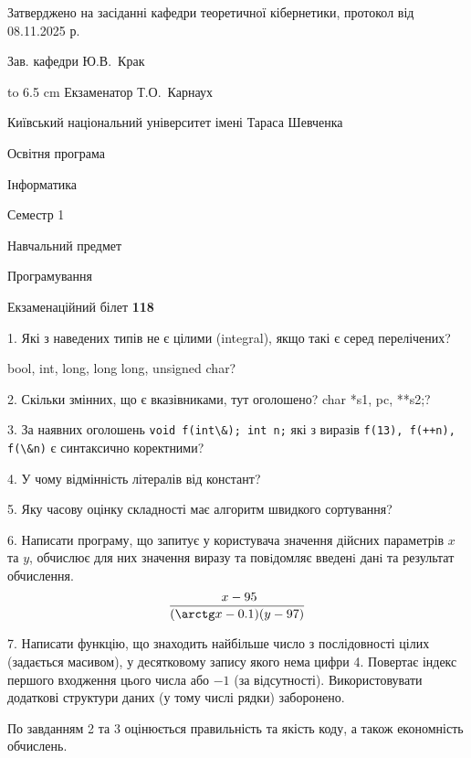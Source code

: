\documentclass[12pt, ukrainian]{article}
\def\code#1{\Verb!#1!}
\begin{document}
{\smallskip\smallskip \begin {scriptsize} Затверджено на засіданні кафедри теоретичної кібернетики, протокол   від   08.11.2025 р.\par\smallskip\smallskip\smallskip\smallskip
{\parbox {6.5 cm} {Зав. кафедри \dotfill Ю.В.~Крак}}\hspace {0.7cm} {\hbox to 6.5 cm { Екзаменатор \dotfill Т.О.~Карнаух}} \end{scriptsize}}
\vspace{0.9cm}
{{\begin {scriptsize}\par
{ \center  Київський національний університет імені Тараса Шевченка \par}
{\parbox {5 cm}{Освітня програма \hfill}{\parbox {7 cm}{Інформатика\hfill}}\parbox {6 cm}{\hfill Семестр 1}}\par
{\parbox {5 cm} {Навчальний предмет \hfill}\parbox {7 cm}{Програмування \hfill}\parbox {6cm}{\hfill}\par}\vspace{-15pt} \end{scriptsize}}{\center Екзаменаційний білет \No \textbf { 118 }\par}}
{%
1. Які з наведених типів не є цілими (integral), якщо такі є серед перелічених?

bool, int, long, long long, unsigned char?
\par
\vspace{2mm}
2. Скільки змінних, що є вказівниками, тут оголошено?
char *s1, pc, **s2;?
\par
\vspace{2mm}
3. За наявних оголошень \code{void f(int\&); int n;} які з виразів \code{f(13), f(++n), f(\&n)} є синтаксично коректними?
\par
\vspace{2mm}
4. У чому відмінність літералів від констант?
\par
\vspace{2mm}
5. Яку часову оцінку складності має алгоритм швидкого сортування?
\par
\vspace{2mm}
6. Написати програму, що запитує у користувача значення дійсних параметрів $x$ та $y$, обчислює для них значення виразу та повiдомляє введенi данi та результат обчислення.
$$\frac{\ x - 95}{(\arctg x - 0.1) (y - 97)}$$ 

\par
7. Написати функцію, що знаходить найбільше число з послідовності цілих (задається масивом), у десятковому запису якого нема цифри 4. Повертає індекс першого входження цього числа або $-1$ (за відсутності). Використовувати додаткові структури даних (у тому числі рядки) заборонено.

По завданням 2 та 3 оцінюється правильність та якість коду, а також економність обчислень.

}
\end{document}
